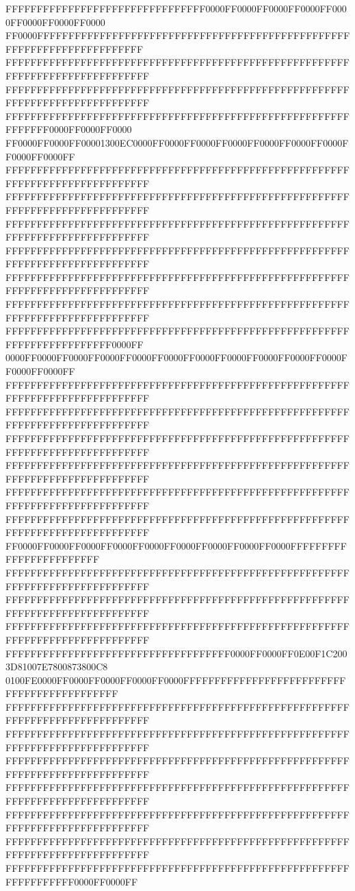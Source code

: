FFFFFFFFFFFFFFFFFFFFFFFFFFFFFFFF0000FF0000FF0000FF0000FF0000FF0000FF0000FF0000
FF0000FFFFFFFFFFFFFFFFFFFFFFFFFFFFFFFFFFFFFFFFFFFFFFFFFFFFFFFFFFFFFFFFFFFFFFFF
FFFFFFFFFFFFFFFFFFFFFFFFFFFFFFFFFFFFFFFFFFFFFFFFFFFFFFFFFFFFFFFFFFFFFFFFFFFFFF
FFFFFFFFFFFFFFFFFFFFFFFFFFFFFFFFFFFFFFFFFFFFFFFFFFFFFFFFFFFFFFFFFFFFFFFFFFFFFF
FFFFFFFFFFFFFFFFFFFFFFFFFFFFFFFFFFFFFFFFFFFFFFFFFFFFFFFFFFFFFF0000FF0000FF0000
FF0000FF0000FF00001300EC0000FF0000FF0000FF0000FF0000FF0000FF0000FF0000FF0000FF
FFFFFFFFFFFFFFFFFFFFFFFFFFFFFFFFFFFFFFFFFFFFFFFFFFFFFFFFFFFFFFFFFFFFFFFFFFFFFF
FFFFFFFFFFFFFFFFFFFFFFFFFFFFFFFFFFFFFFFFFFFFFFFFFFFFFFFFFFFFFFFFFFFFFFFFFFFFFF
FFFFFFFFFFFFFFFFFFFFFFFFFFFFFFFFFFFFFFFFFFFFFFFFFFFFFFFFFFFFFFFFFFFFFFFFFFFFFF
FFFFFFFFFFFFFFFFFFFFFFFFFFFFFFFFFFFFFFFFFFFFFFFFFFFFFFFFFFFFFFFFFFFFFFFFFFFFFF
FFFFFFFFFFFFFFFFFFFFFFFFFFFFFFFFFFFFFFFFFFFFFFFFFFFFFFFFFFFFFFFFFFFFFFFFFFFFFF
FFFFFFFFFFFFFFFFFFFFFFFFFFFFFFFFFFFFFFFFFFFFFFFFFFFFFFFFFFFFFFFFFFFFFFFFFFFFFF
FFFFFFFFFFFFFFFFFFFFFFFFFFFFFFFFFFFFFFFFFFFFFFFFFFFFFFFFFFFFFFFFFFFFFFFF0000FF
0000FF0000FF0000FF0000FF0000FF0000FF0000FF0000FF0000FF0000FF0000FF0000FF0000FF
FFFFFFFFFFFFFFFFFFFFFFFFFFFFFFFFFFFFFFFFFFFFFFFFFFFFFFFFFFFFFFFFFFFFFFFFFFFFFF
FFFFFFFFFFFFFFFFFFFFFFFFFFFFFFFFFFFFFFFFFFFFFFFFFFFFFFFFFFFFFFFFFFFFFFFFFFFFFF
FFFFFFFFFFFFFFFFFFFFFFFFFFFFFFFFFFFFFFFFFFFFFFFFFFFFFFFFFFFFFFFFFFFFFFFFFFFFFF
FFFFFFFFFFFFFFFFFFFFFFFFFFFFFFFFFFFFFFFFFFFFFFFFFFFFFFFFFFFFFFFFFFFFFFFFFFFFFF
FFFFFFFFFFFFFFFFFFFFFFFFFFFFFFFFFFFFFFFFFFFFFFFFFFFFFFFFFFFFFFFFFFFFFFFFFFFFFF
FFFFFFFFFFFFFFFFFFFFFFFFFFFFFFFFFFFFFFFFFFFFFFFFFFFFFFFFFFFFFFFFFFFFFFFFFFFFFF
FF0000FF0000FF0000FF0000FF0000FF0000FF0000FF0000FF0000FFFFFFFFFFFFFFFFFFFFFFFF
FFFFFFFFFFFFFFFFFFFFFFFFFFFFFFFFFFFFFFFFFFFFFFFFFFFFFFFFFFFFFFFFFFFFFFFFFFFFFF
FFFFFFFFFFFFFFFFFFFFFFFFFFFFFFFFFFFFFFFFFFFFFFFFFFFFFFFFFFFFFFFFFFFFFFFFFFFFFF
FFFFFFFFFFFFFFFFFFFFFFFFFFFFFFFFFFFFFFFFFFFFFFFFFFFFFFFFFFFFFFFFFFFFFFFFFFFFFF
FFFFFFFFFFFFFFFFFFFFFFFFFFFFFFFFFFFF0000FF0000FF0E00F1C2003D81007E7800873800C8
0100FE0000FF0000FF0000FF0000FF0000FFFFFFFFFFFFFFFFFFFFFFFFFFFFFFFFFFFFFFFFFFFF
FFFFFFFFFFFFFFFFFFFFFFFFFFFFFFFFFFFFFFFFFFFFFFFFFFFFFFFFFFFFFFFFFFFFFFFFFFFFFF
FFFFFFFFFFFFFFFFFFFFFFFFFFFFFFFFFFFFFFFFFFFFFFFFFFFFFFFFFFFFFFFFFFFFFFFFFFFFFF
FFFFFFFFFFFFFFFFFFFFFFFFFFFFFFFFFFFFFFFFFFFFFFFFFFFFFFFFFFFFFFFFFFFFFFFFFFFFFF
FFFFFFFFFFFFFFFFFFFFFFFFFFFFFFFFFFFFFFFFFFFFFFFFFFFFFFFFFFFFFFFFFFFFFFFFFFFFFF
FFFFFFFFFFFFFFFFFFFFFFFFFFFFFFFFFFFFFFFFFFFFFFFFFFFFFFFFFFFFFFFFFFFFFFFFFFFFFF
FFFFFFFFFFFFFFFFFFFFFFFFFFFFFFFFFFFFFFFFFFFFFFFFFFFFFFFFFFFFFFFFFFFFFFFFFFFFFF
FFFFFFFFFFFFFFFFFFFFFFFFFFFFFFFFFFFFFFFFFFFFFFFFFFFFFFFFFFFFFFFFFF0000FF0000FF
